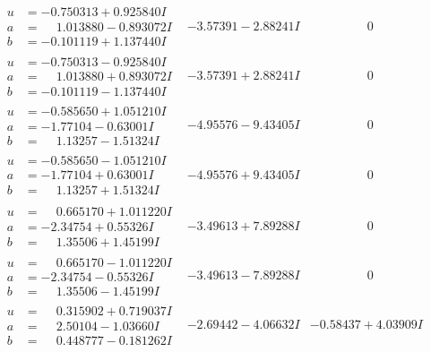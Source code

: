 \documentclass[1p]{elsarticle_modified}
\theoremstyle{definition}
\begin{document}
$$\begin{array}{c|c|c}
\begin{aligned}
u &= -0.750313 + 0.925840 I \\
a &= \phantom{-}1.013880 - 0.893072 I \\
b &= -0.101119 + 1.137440 I\end{aligned}
 & -3.57391 - 2.88241 I & \phantom{-0.000000 } 0 \\ \hline\begin{aligned}
u &= -0.750313 - 0.925840 I \\
a &= \phantom{-}1.013880 + 0.893072 I \\
b &= -0.101119 - 1.137440 I\end{aligned}
 & -3.57391 + 2.88241 I & \phantom{-0.000000 } 0 \\ \hline\begin{aligned}
u &= -0.585650 + 1.051210 I \\
a &= -1.77104 - 0.63001 I \\
b &= \phantom{-}1.13257 - 1.51324 I\end{aligned}
 & -4.95576 - 9.43405 I & \phantom{-0.000000 } 0 \\ \hline\begin{aligned}
u &= -0.585650 - 1.051210 I \\
a &= -1.77104 + 0.63001 I \\
b &= \phantom{-}1.13257 + 1.51324 I\end{aligned}
 & -4.95576 + 9.43405 I & \phantom{-0.000000 } 0 \\ \hline\begin{aligned}
u &= \phantom{-}0.665170 + 1.011220 I \\
a &= -2.34754 + 0.55326 I \\
b &= \phantom{-}1.35506 + 1.45199 I\end{aligned}
 & -3.49613 + 7.89288 I & \phantom{-0.000000 } 0 \\ \hline\begin{aligned}
u &= \phantom{-}0.665170 - 1.011220 I \\
a &= -2.34754 - 0.55326 I \\
b &= \phantom{-}1.35506 - 1.45199 I\end{aligned}
 & -3.49613 - 7.89288 I & \phantom{-0.000000 } 0 \\ \hline\begin{aligned}
u &= \phantom{-}0.315902 + 0.719037 I \\
a &= \phantom{-}2.50104 - 1.03660 I \\
b &= \phantom{-}0.448777 - 0.181262 I\end{aligned}
 & -2.69442 - 4.06632 I & -0.58437 + 4.03909 I \\ \hline\begin{aligned}

\end{aligned}
\end{array}$$
\end{document}
